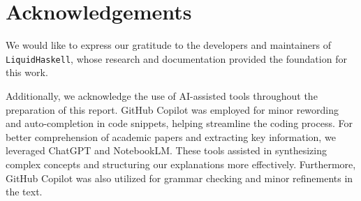 \documentclass[]{rptuseminar}
\begin{document}
\section*{Acknowledgements}
We would like to express our gratitude to the developers and maintainers of \texttt{LiquidHaskell}, whose research and 
documentation provided the foundation for this work.

Additionally, we acknowledge the use of AI-assisted tools throughout the preparation of this report. 
GitHub Copilot was employed for minor rewording and auto-completion in code snippets, 
helping streamline the coding process. For better comprehension of academic papers and extracting key information, 
we leveraged ChatGPT and NotebookLM. These tools assisted in synthesizing complex concepts and structuring 
our explanations more effectively. Furthermore, GitHub Copilot was also utilized for grammar checking and minor 
refinements in the text.
\newpage
\nocite{*}



\end{document}
